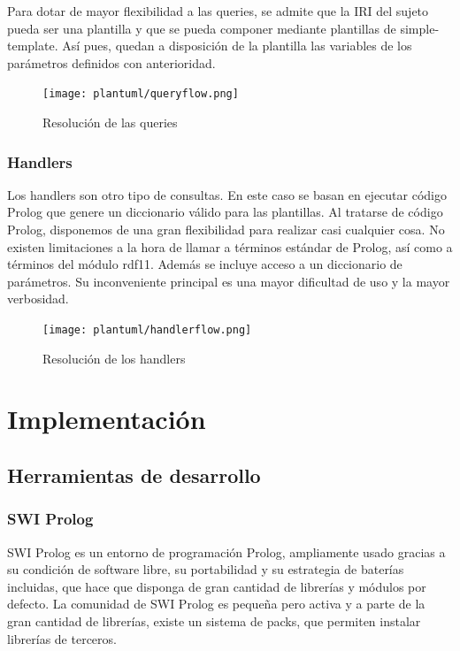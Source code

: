 \documentclass[12pt]{report} %
\begin{document}
Para dotar de mayor flexibilidad a las queries, se admite que la IRI del sujeto pueda ser una plantilla y que se pueda componer mediante plantillas de simple-template. Así pues, quedan a disposición de la plantilla las variables de los parámetros definidos con anterioridad.

\begin{figure}
    \centering
    \texttt{[image: plantuml/queryflow.png]}
    \caption{Resolución de las queries}
    \label{fig:queryflow}
\end{figure}

\subsection{Handlers}

Los handlers son otro tipo de consultas. En este caso se basan en ejecutar código Prolog que genere un diccionario válido para las plantillas. Al tratarse de código Prolog, disponemos de una gran flexibilidad para realizar casi cualquier cosa. No existen limitaciones a la hora de llamar a términos estándar de Prolog, así como a términos del módulo rdf11. Además se incluye acceso a un diccionario de parámetros. Su inconveniente principal es una mayor dificultad de uso y la mayor verbosidad.

\begin{figure}
    \centering
    \texttt{[image: plantuml/handlerflow.png]}
    \caption{Resolución de los handlers}
    \label{fig:handlerflow}
\end{figure}

\chapter{Implementación}

\section{Herramientas de desarrollo}
\subsection{SWI Prolog}
SWI Prolog\cite{prolog} es un entorno de programación Prolog, ampliamente usado gracias a su condición de software libre, su portabilidad y 
su estrategia de baterías incluidas, que hace que disponga de gran cantidad de librerías y módulos por defecto.
La comunidad de SWI Prolog es pequeña pero activa y a parte de la gran cantidad de librerías, existe un sistema de packs, que permiten instalar librerías de terceros.
\end{document}
